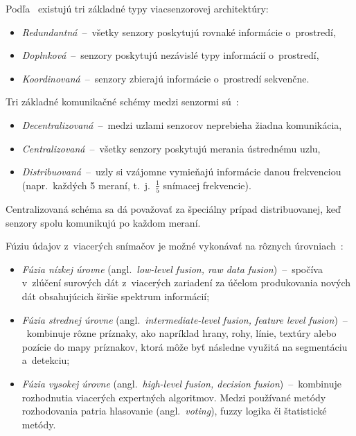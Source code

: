     \noindent Podľa~\cite{tzafestas12MobileRobot2014} existujú tri základné typy viacsenzorovej architektúry:
    \begin{itemize}
        \item \emph{Redundantná}~--~všetky senzory poskytujú rovnaké informácie o~prostredí,
        \item \emph{Doplnková}~--~senzory poskytujú nezávislé typy informácií o~prostredí,
        \item \emph{Koordinovaná}~--~senzory zbierajú informácie o~prostredí sekvenčne.
    \end{itemize}
    Tri základné komunikačné schémy medzi senzormi sú~\cite{tzafestas12MobileRobot2014}:
    \begin{itemize}
        \item \emph{Decentralizovaná}~--~medzi uzlami senzorov neprebieha žiadna komunikácia,
        \item \emph{Centralizovaná}~--~všetky senzory poskytujú merania ústrednému uzlu,
        \item \emph{Distribuovaná}~--~uzly si vzájomne vymieňajú informácie danou frekvenciou (napr.\ každých 5 meraní, t.\ j.\ $\frac{1}{5}$ snímacej frekvencie).
    \end{itemize}
    Centralizovaná schéma sa dá považovať za špeciálny prípad distribuovanej, keď senzory spolu komunikujú po každom meraní.
    
    Fúziu údajov z~viacerých snímačov je možné vykonávať na rôznych úrovniach~\cite{elmenreichIntroductionSensorFusion}:
    \begin{itemize}
        \item \emph{Fúzia nízkej úrovne} (angl.\ \textit{low-level fusion, raw data fusion})~--~spočíva v~zlúčení surových dát z~viacerých zariadení za účelom produkovania nových dát obsahujúcich širšie spektrum informácií;
        
        \item \emph{Fúzia strednej úrovne} (angl.\ \textit{intermediate-level fusion, feature level fusion})~--~kombinuje rôzne príznaky, ako napríklad hrany, rohy, línie, textúry alebo pozície do mapy príznakov, ktorá môže byť následne využitá na segmentáciu a~detekciu;
        
        \item \emph{Fúzia vysokej úrovne} (angl.\ \textit{high-level fusion, decision fusion})~--~kombinuje rozhodnutia viacerých expertných algoritmov. Medzi používané metódy rozhodovania patria hlasovanie (angl.\ \textit{voting}), fuzzy logika či štatistické metódy.
    \end{itemize}
    
